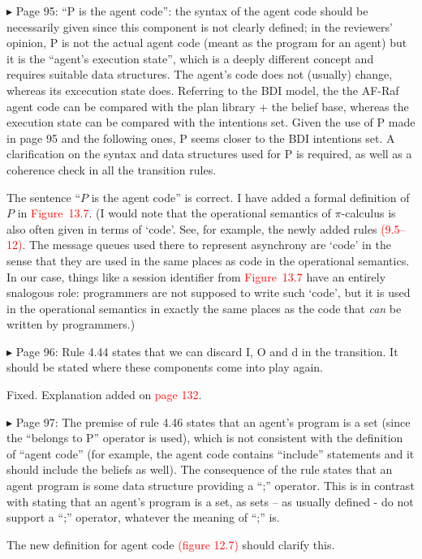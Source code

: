 \documentclass{article}
\newcommand*\R[1]{\textcolor{red}{#1}} %
\newenvironment{them}%
  {\bigskip\noindent\begingroup\color{blue}$\blacktriangleright$\enspace}%
  {\endgroup\par}
\begin{document}
\begin{them}
Page 95:
``P is the agent code'': the syntax of the agent code should be necessarily given
since this component is not clearly defined; in the reviewers' opinion, P is
not the actual agent code (meant as the program for an agent) but it is the
``agent's execution state'', which is a deeply different concept and requires
suitable data structures. The agent's code does not (usually) change, whereas
its excecution state does. Referring to the BDI model, the the AF-Raf agent
code can be compared with the plan library + the belief base, whereas the
execution state can be compared with the intentions set. Given the use of P
made in page 95 and the following ones, P seems closer to the BDI intentions
set. A clarification on the syntax and data structures used for P is required,
as well as a coherence check in all the transition rules.
\end{them}
The sentence ``$P$ is the agent code'' is correct.
I have added a formal definition of $P$ in \R{Figure~13.7}.
(I would note that the operational semantics of $\pi$-calculus is also
  often given in terms of `code'.
See, for example, the newly added rules \R{(9.5--12)}.
The message queues used there to represent asynchrony are `code'
  in the sense that they are used in the same places as code in the operational semantics.
In our case, things like a session identifier from \R{Figure~13.7}
  have an entirely snalogous role:
  programmers are not supposed to write such `code',
  but it is used in the operational semantics in exactly the same
    places as the code that \emph{can} be written by programmers.)


\begin{them}
Page 96:
Rule 4.44 states that we can discard I, O and d in the transition. It should be
stated where these components come into play again.
\end{them}
Fixed. Explanation added on \R{page 132}.

\begin{them}
Page 97:
The premise of rule 4.46 states that an agent's program is a set (since the
``belongs to P'' operator is used), which is not consistent with the definition
of ``agent code'' (for example, the agent code contains ``include'' statements and
it should include the beliefs as well). The consequence of the rule states that
an agent program is some data structure providing a ``;'' operator. This is in
contrast with stating that an agent's program is a set, as sets – as usually
defined - do not support a ``;'' operator, whatever the meaning of ``;'' is.
\end{them}
The new definition for agent code \R{(figure 12.7)} should clarify this.
\end{document}
